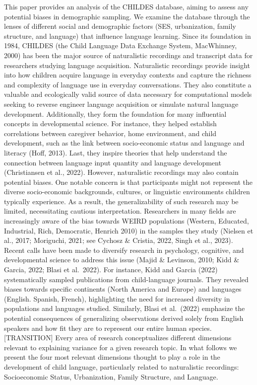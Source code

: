 \documentclass[
  man,floatsintext]{apa6}
\begin{document}
This paper provides an analysis of the CHILDES database, aiming to assess any potential biases in demographic sampling. We examine the database through the lenses of different social and demographic factors (SES, urbanization, family structure, and language) that influence language learning.
Since its foundation in 1984, CHILDES (the Child Language Data Exchange System, MacWhinney, 2000) has been the major source of naturalistic recordings and transcript data for researchers studying language acquisition. Naturalistic recordings provide insight into how children acquire language in everyday contexts and capture the richness and complexity of language use in everyday conversations. They also constitute a valuable and ecologically valid source of data necessary for computational models seeking to reverse engineer language acquisition or simulate natural language development. Additionally, they form the foundation for many influential concepts in developmental science. For instance, they helped establish correlations between caregiver behavior, home environment, and child development, such as the link between socio-economic status and language and literacy (Hoff, 2013). Last, they inspire theories that help understand the connection between language input quantity and language development (Christiansen et al., 2022).
However, naturalistic recordings may also contain potential biases. One notable concern is that participants might not represent the diverse socio-economic backgrounds, cultures, or linguistic environments children typically experience. As a result, the generalizability of such research may be limited, necessitating cautious interpretation.
Researchers in many fields are increasingly aware of the bias towards WEIRD populations (Western, Educated, Industrial, Rich, Democratic, Henrich 2010) in the samples they study (Nielsen et al., 2017; Moriguchi, 2021; see Cychosz \& Cristia, 2022, Singh et al., 2023). Recent calls have been made to diversify research in psychology, cognitive, and developmental science to address this issue (Majid \& Levinson, 2010; Kidd \& Garcia, 2022; Blasi et al.~2022). For instance, Kidd and Garcia (2022) systematically sampled publications from child-language journals. They revealed biases towards specific continents (North America and Europe) and languages (English. Spanish, French), highlighting the need for increased diversity in populations and languages studied. Similarly, Blasi et al.~(2022) emphasize the potential consequences of generalizing observations derived solely from English speakers and how fit they are to represent our entire human species.
{[}TRANSITION{]}
Every area of research conceptualizes different dimensions relevant to explaining variance for a given research topic. In what follows we present the four most relevant dimensions thought to play a role in the development of child language, particularly related to naturalistic recordings: Socioeconomic Status, Urbanization, Family Structure, and Language.
\end{document}
